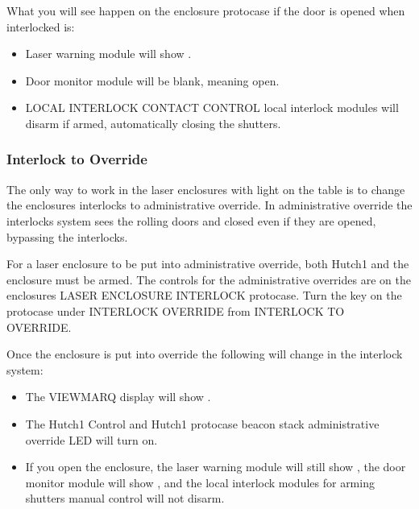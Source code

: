 \documentclass[letterpaper,10pt,english]{sphinxmanual}
\begin{document}
\sphinxAtStartPar
What you will see happen on the enclosure protocase if the door is opened when interlocked is:
\begin{itemize}
\item {} 
\sphinxAtStartPar
Laser warning module will show .

\item {} 
\sphinxAtStartPar
Door monitor module will be blank, meaning open.

\item {} 
\sphinxAtStartPar
LOCAL INTERLOCK CONTACT CONTROL local interlock modules will disarm if armed, automatically closing the shutters.

\end{itemize}


\subsubsection{Interlock to Override}
\label{\detokenize{user_documentation/Hutch-1_laser:interlock-to-override}}
\sphinxAtStartPar
The only way to work in the laser enclosures with light on the table is to change the enclosures interlocks to administrative override.
In administrative override the interlocks system sees the rolling doors and closed even if they are opened, bypassing the interlocks.

\sphinxAtStartPar
For a laser enclosure to be put into administrative override, both Hutch\sphinxhyphen{}1 and the enclosure must be armed.
The controls for the administrative overrides are on the enclosures LASER ENCLOSURE INTERLOCK protocase.
Turn the key on the protocase under INTERLOCK OVERRIDE from INTERLOCK TO OVERRIDE.

\sphinxAtStartPar
Once the enclosure is put into override the following will change in the interlock system:
\begin{itemize}
\item {} 
\sphinxAtStartPar
The VIEWMARQ display will show .

\item {} 
\sphinxAtStartPar
The Hutch\sphinxhyphen{}1 Control and Hutch\sphinxhyphen{}1 protocase beacon stack  administrative override LED will turn on.

\item {} 
\sphinxAtStartPar
If you open the enclosure,  the laser warning module will still show , the door monitor module will show , and the local interlock modules for arming shutters manual control will not disarm.

\end{itemize}
\end{document}
